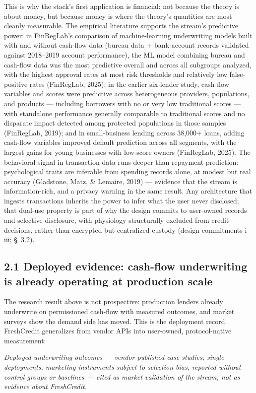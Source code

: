 \documentclass[11pt,twocolumn]{article}
\begin{document}
This is why the stack's first application is financial: not because the theory is about money, but because money is where the theory's quantities are most cleanly measurable. The empirical literature supports the stream's predictive power: in FinRegLab's comparison of machine-learning underwriting models built with and without cash-flow data (bureau data + bank-account records validated against 2018--2019 account performance), the ML model combining bureau and cash-flow data was the most predictive overall and across all subgroups analyzed, with the highest approval rates at most risk thresholds and relatively low false-positive rates (FinRegLab, 2025); in the earlier six-lender study, cash-flow variables and scores were predictive across heterogeneous providers, populations, and products --- including borrowers with no or very low traditional scores --- with standalone performance generally comparable to traditional scores and no disparate impact detected among protected populations in those samples (FinRegLab, 2019); and in small-business lending across 38,000+ loans, adding cash-flow variables improved default prediction across all segments, with the largest gains for young businesses with low-score owners (FinRegLab, 2025). The behavioral signal in transaction data runs deeper than repayment prediction: psychological traits are inferable from spending records alone, at modest but real accuracy (Gladstone, Matz, \& Lemaire, 2019) --- evidence that the stream is information-rich, and a privacy warning in the same result. Any architecture that ingests transactions inherits the power to infer what the user never disclosed; that dual-use property is part of why the design commits to user-owned records and selective disclosure, with physiology structurally excluded from credit decisions, rather than encrypted-but-centralized custody (design commitments i--iii; \S~3.2).

\subsection*{2.1 Deployed evidence: cash-flow underwriting is already operating at production scale}

The research result above is not prospective: production lenders already underwrite on permissioned cash-flow with measured outcomes, and market surveys show the demand side has moved. This is the deployment record FreshCredit generalizes from vendor APIs into user-owned, protocol-native measurement:

\emph{Deployed underwriting outcomes --- vendor-published case studies; single deployments, marketing instruments subject to selection bias, reported without control groups or baselines --- cited as market validation of the stream, not as evidence about FreshCredit.}
\end{document}
